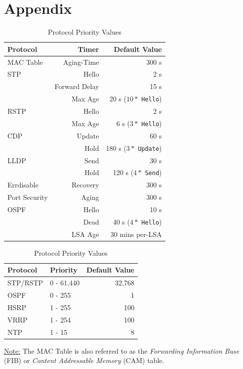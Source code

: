 \documentclass[12pt]{article}
\newif\ifcolor											%
\newcommand{\note}[1]{\ifcolor \colorbox{#1}{Note:}\else \underline{Note:}\fi}
\begin{document}
\section{Appendix \label{sec:APPENDIX}}
	\begin{table}[H]
	\begin{minipage}[t]{.55\linewidth}
	\centering
	\caption{Protocol Timers \label{tab:DEFAULT TIMERS}}
	\begin{tabular}{@{} l r r @{}}\hline
	\textbf{Protocol}		& \textbf{Timer}	& \textbf{Default Value}\\\hline
	MAC Table 			& Aging-Time	& 300 s\\\hline
	STP				& Hello		& 2 s\\
					& Forward Delay	& 15 s\\
					& Max Age		& 20 s ($10*$ \texttt{Hello})\\\hline
	RSTP				& Hello		& 2 s\\
					& Max Age		& 6 s ($3*$ \texttt{Hello})\\\hline
	CDP				& Update		& 60 s\\
					& Hold		& 180 s ($3*$ \texttt{Update})\\\hline
	LLDP				& Send		& 30 s\\
					& Hold		& 120 s ($4*$ \texttt{Send})\\\hline
	Errdisable			& Recovery 	& 300 s\\\hline
	Port Security		& Aging		& 300 s\\\hline
	OSPF				& Hello		& 10 s\\
					& Dead		& 40 s ($4*$ \texttt{Hello})\\
					& LSA Age		& 30 mins per-LSA\\\hline
	\end{tabular}\end{minipage}\hfill
	\begin{minipage}[t]{.45\linewidth}
	\centering
	\caption{Protocol Priority Values\label{tab:DEFAULT PRIORITIES}}
	\begin{tabular}{@{} l l r @{}}\hline
	\textbf{Protocol}		& \textbf{Priority}		& \textbf{Default Value}\\\hline
	STP/RSTP			& 0 - 61,440			& 32,768\\
	OSPF				& 0 - 255			& 1\\
	HSRP				& 1 - 255			& 100\\
	VRRP				& 1 - 254			& 100\\
	NTP				& 1 - 15			& 8\\\hline
	\end{tabular}\end{minipage}\end{table}
	\note{Goldenrod} The MAC Table is also referred to as the \textit{Forwarding Information Base} (FIB) or \textit{Content Addressable Memory} (CAM) table.
\end{document}
